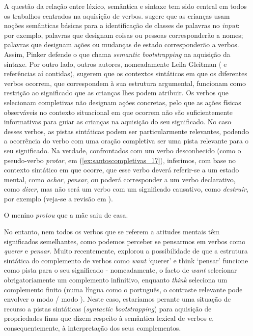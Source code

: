 \documentclass[output=paper]{LSP/langsci}
\begin{document}
A questão da relação entre léxico, semântica e sintaxe tem sido central em todos os trabalhos centrados na aquisição de verbos. \citet{pinker1984} sugere que as crianças usam noções semânticas básicas para a identificação de classes de palavras no \textit{input}: por exemplo, palavras que designam coisas ou pessoas corresponderão a nomes; palavras que designam ações ou mudanças de estado corresponderão a verbos. Assim, Pinker defende o que chama \textit{semantic bootstrapping} na aquisição da sintaxe. Por outro lado, outros autores, nomeadamente Leila Gleitman (\citealt{gleitman_etal2005} e referências aí contidas), sugerem que os contextos sintáticos em que os diferentes verbos ocorrem, que correspondem à sua estrutura argumental, funcionam como restrição ao significado que as crianças lhes podem atribuir. Os verbos que selecionam completivas não designam ações concretas, pelo que as ações físicas observáveis no contexto situacional em que ocorrem não são suficientemente informativas para guiar as crianças na aquisição do seu significado. No caso desses verbos, as pistas sintáticas podem ser particularmente relevantes, podendo a ocorrência do verbo com uma oração completiva ser uma pista relevante para o seu significado. Na verdade, confrontados com um verbo desconhecido (como o pseudo-verbo \textit{protar}, em (\ref{ex:santoscompletivas_17}), inferimos, com base no contexto sintático em que ocorre, que esse verbo deverá referir-se a um estado mental, como \textit{achar}, \textit{pensar}, ou poderá corresponder a um verbo declarativo, como \textit{dizer}, mas não será um verbo com um significado causativo, como \textit{destruir}, por exemplo (veja-se a revisão em \citealt[90--98]{guasti2002}).

\ea\label{ex:santoscompletivas_17}
O menino \textit{protou} que a mãe saiu de casa.
\z

No entanto, nem todos os verbos que se referem a atitudes mentais têm significados semelhantes, como podemos perceber se pensarmos em verbos como \textit{querer} e \textit{pensar}. Muito recentemente, \citet{hacquard2014} explorou a possibilidade de que a estrutura sintática do complemento de verbos como \textit{want} `querer' e think `pensar' funcione como pista para o seu significado - nomeadamente, o facto de \textit{want} selecionar obrigatoriamente um complemento infinitivo, enquanto \textit{think} seleciona um complemento finito (numa língua como o português, o contraste relevante pode envolver o modo  / modo ). Neste caso, estaríamos perante uma situação de recurso a pistas sintáticas (\textit{syntactic bootstrapping}) para aquisição de propriedades finas que dizem respeito à semântica lexical de verbos e, consequentemente, à interpretação dos seus complementos.
\end{document}
